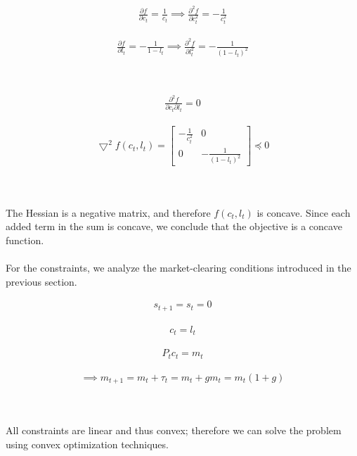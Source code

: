\begin{minipage}{0.4\textwidth}
\begin{align*}
\frac{\partial f}{\partial c_t} = \frac{1}{c_t} \implies \frac{\partial^2 f}{\partial c_t^2}= -\frac{1}{c_t^2}
\end{align*}
\end{minipage}
\begin{minipage}{0.6\textwidth}
\begin{align*}
\frac{\partial f}{\partial l_t}= -\frac{1}{1-l_t} \implies \frac{\partial^2 f}{\partial l_t^2}= -\frac{1}{(1-l_t)^2}
\end{align*}
\end{minipage}
\\
\begin{minipage}{0.5\textwidth}
\begin{align*}
\frac{\partial^2 f}{\partial c_t \partial l_t}= 0
\end{align*}
\end{minipage}
\begin{minipage}{0.5\textwidth}
\begin{align*}
\bigtriangledown^2f(c_t,l_t)= \begin{bmatrix}
-\frac{1}{c_t^2} & 0 \\
0 & -\frac{1}{(1-l_t)^2}
\end{bmatrix}
\preceq 0
\end{align*}
\end{minipage}
\\\\
The Hessian is a negative matrix, and therefore $f(c_t,l_t)$ is concave. Since each added term in the sum is concave, we conclude that the objective is a concave function.\\
\\For the constraints, we analyze the market-clearing conditions introduced in the previous section.\\
\begin{minipage}{0.15\textwidth}
\begin{align*}
s_{t+1}=s_{t}=0
\end{align*}
\end{minipage}
\begin{minipage}{0.15\textwidth}
\begin{align*}
c_{t}=l_{t}
\end{align*}
\end{minipage}
\begin{minipage}{0.15\textwidth}
\begin{align*}
P_t c_{t}=m_{t}
\end{align*}
\end{minipage}
\begin{minipage}{0.55\textwidth}
\begin{align*}
\implies m_{t+1}=m_t+\tau_t=m_t+gm_t=m_t(1+g)
\end{align*}
\end{minipage}
\\
\\All constraints are linear and thus convex; therefore we can solve the problem using convex optimization techniques.






